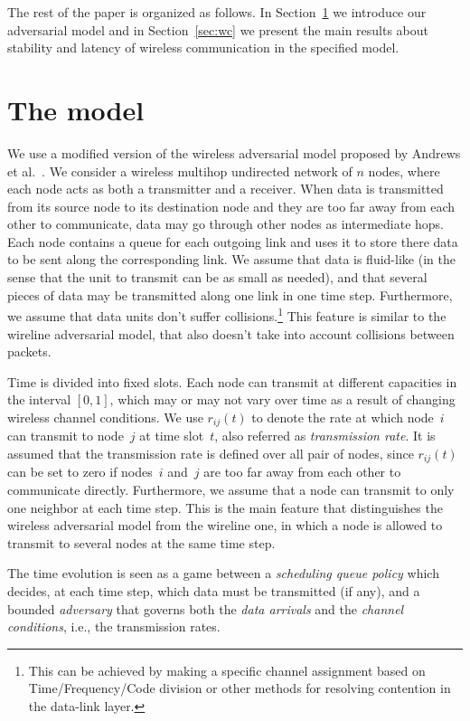 \documentclass[journal,twocolumn]{./IEEEtran}
\begin{document}
The rest of the paper is organized as follows. In Section~\ref{sec:model} we introduce our adversarial model and in
Section~\ref{sec:wc} we present the main results about stability and latency
of wireless communication in the specified model.




\section{The model}	
\label{sec:model}


We use a modified version of the wireless adversarial model proposed 
by Andrews et al.~\cite{DBLP:journals/talg/AndrewsZ07}. We consider a wireless multihop undirected network of $n$ nodes, where each node acts as both a transmitter and a receiver. When data is transmitted from its source node to its destination node and they are too far away from each other to communicate, data may go through other nodes as intermediate hops. Each node contains a queue for each outgoing link and uses it to store there data to be sent along the corresponding link. We assume that data is fluid-like (in the sense that the unit to transmit can be as small as needed), and that several pieces of data may be transmitted along one link in one time step. Furthermore, we assume that data units don't suffer collisions.\footnote{This can be achieved by making a specific channel assignment based on Time/Frequency/Code division or other methods for resolving contention in the data-link layer.} This feature is similar to the wireline adversarial model, that also doesn't take into account collisions between packets.

Time is divided into fixed slots. Each node can transmit at different  capacities in the interval $[0,1]$, which may or may not vary over time as a result of changing wireless channel conditions. We use $r_{ij}(t)$ to denote the rate at which node~$i$ can transmit to node~$j$ at time slot~$t$, also referred as \emph{transmission rate}. It is assumed that the transmission rate is defined over all pair of nodes, since $r_{ij}(t)$ can be set to zero if nodes~$i$ and~$j$ are too far away from each other to communicate directly. Furthermore, we assume that a node can transmit to only one neighbor at each time step. This is the main feature that distinguishes the wireless adversarial model from the wireline one, in which a node is allowed to transmit to several nodes at the same time step.

The time evolution is seen as a game between a \emph{scheduling queue policy} which decides, at each time step, which data must be transmitted (if any), and a bounded \emph{adversary} that governs both the \emph{data arrivals} and the \emph{channel conditions}, i.e., the transmission rates.
\end{document}
